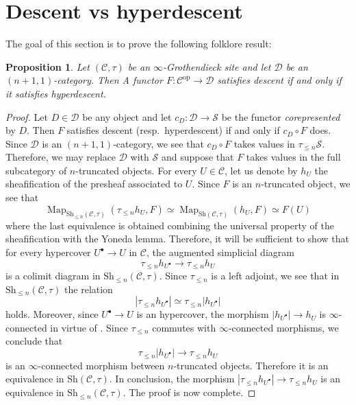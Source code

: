 \documentclass[12pt,a4paper,reqno]{amsart}
\theoremstyle{plain}
\newtheorem{prop}[thm]{Proposition}
\theoremstyle{definition}
\theoremstyle{remark}
\numberwithin{equation}{section}
\begin{document}
\section{Descent vs hyperdescent}

The goal of this section is to prove the following folklore result:

\begin{prop} \label{prop:descent_vs_hyperdescent}
	Let $({\mathcal C}, \tau)$ be an $\infty$-Grothendieck site and let ${\mathcal D}$ be an $(n+1,1)$-category.
	Then A functor $F \colon {\mathcal C}^{\mathrm{op}} \to {\mathcal D}$ satisfies descent if and only if it satisfies hyperdescent.
\end{prop}

\begin{proof}
	Let $D \in {\mathcal D}$ be any object and let $c_D \colon {\mathcal D} \to {\mathcal S}$ be the functor \emph{corepresented} by $D$.
	Then $F$ satisfies descent (resp.\ hyperdescent) if and only if $c_D \circ F$ does.
	Since ${\mathcal D}$ is an $(n+1,1)$-category, we see that $c_D \circ F$ takes values in $\tau_{\le n} {\mathcal S}$. 
	Therefore, we may replace ${\mathcal D}$ with ${\mathcal S}$ and suppose that $F$ takes values in the full subcategory of $n$-truncated objects.
	For every $U \in {\mathcal C}$, let us denote by $h_U$ the sheafification of the presheaf associated to $U$.
	Since $F$ is an $n$-truncated object, we see that
	\[ \operatorname{Map}_{{\mathrm{Sh}}_{\le n}({\mathcal C}, \tau)}(\tau_{\le n} h_U, F) \simeq \operatorname{Map}_{{\mathrm{Sh}}({\mathcal C}, \tau)}(h_U, F) \simeq F(U) \]
	where the last equivalence is obtained combining the universal property of the sheafification with the Yoneda lemma.
	Therefore, it will be sufficient to show that for every hypercover $U^\bullet \to U$ in ${\mathcal C}$, the augmented simplicial diagram
	\[ \tau_{\le n} h_{U^\bullet} \to \tau_{\le n} h_U \]
	is a colimit diagram in ${\mathrm{Sh}}_{\le n}({\mathcal C}, \tau)$.
	Since $\tau_{\le n}$ is a left adjoint, we see that in ${\mathrm{Sh}}_{\le n}({\mathcal C}, \tau)$ the relation
	\[ |\tau_{\le n} h_{U^\bullet}| \simeq \tau_{\le n} |h_{U^\bullet}| \]
	holds.
	Moreover, since $U^\bullet \to U$ is an hypercover, the morphism $|h_{U^\bullet}| \to h_U$ is $\infty$-connected in virtue of \cite[6.5.3.11]{HTT}.
	Since $\tau_{\le n}$ commutes with $\infty$-connected morphisms, {\ignorespaces} we conclude that
	\[ \tau_{\le n} |h_{U^\bullet}| \to \tau_{\le n} h_U \]
	is an $\infty$-connected morphism between $n$-truncated objects.
	Therefore it is an equivalence in ${\mathrm{Sh}}({\mathcal C}, \tau)$.
	In conclusion, the morphism $|\tau_{\le n} h_{U^\bullet}| \to \tau_{\le n} h_U$ is an equivalence in ${\mathrm{Sh}}_{\le n}({\mathcal C}, \tau)$.
	The proof is now complete.
\end{proof}
\end{document}
